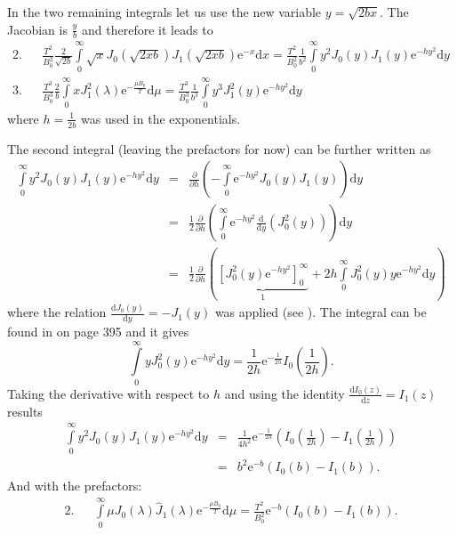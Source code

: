 \documentclass[a4paper,10pt]{article}
\begin{document}
In the two remaining integrals let us use the new variable $y=\sqrt{2 b x}$. The Jacobian is $\frac{y}{b}$ and therefore it leads to
\begin{eqnarray*}
	2. && \frac{T^2}{B_0^2} \frac{2}{\sqrt{2b}} \int \limits_{0}^{\infty} \sqrt{x} J_0(\sqrt{2 x b}) J_1(\sqrt{2 x b}) \mathrm{e}^{-x} \mathrm{d} x = \frac{T^2}{B_0^2} \frac{1}{b^2} \int \limits_{0}^{\infty} y^2 J_0(y) J_1(y) \mathrm{e}^{-h y^2} \mathrm{d}y \\
	3. && \frac{T^3}{B_0^3} \frac{2}{b} \int \limits_{0}^{\infty} x J_1^2(\lambda) \mathrm{e}^{-\frac{\mu B_0}{T}} \mathrm{d} \mu = \frac{T^3}{B_0^3} \frac{1}{b^3} \int \limits_{0}^{\infty} y^3 J_1^2(y) \mathrm{e}^{-h y^2} \mathrm{d} y
\end{eqnarray*}
where $h = \frac{1}{2b}$ was used in the exponentials. 

The second integral (leaving the prefactors for now) can be further written as
\begin{eqnarray*}
	\int \limits_{0}^{\infty} y^2 J_0(y) J_1(y) \mathrm{e}^{-h y^2} \mathrm{d}y &=& \frac{\partial}{\partial h} \left( - \int \limits_0^{\infty} \mathrm{e}^{-hy^2} J_0(y) J_1(y) \right) \mathrm{d} y\\
	&=& \frac{1}{2} \frac{\partial}{\partial h} \left( \int \limits_0^{\infty} \mathrm{e}^{-hy^2} \frac{\mathrm{d}}{\mathrm{d} y} \left(J_0^2(y)\right) \right) \mathrm{d}y \\
	&=& \frac{1}{2} \frac{\partial}{\partial h} \left( \underbrace{\left[ J_0^2(y) \mathrm{e}^{-h y^2} \right]_0^{\infty}}_{1}  + 2 h \int \limits_0^{\infty} J_0^2(y) y \mathrm{e}^{-h y^2} \mathrm{d}y \right)
\end{eqnarray*}
where the relation $\frac{\mathrm{d} J_0(y)}{\mathrm{d} y} = - J_1(y)$ was applied (see \cite{a_and_s}). The integral can be found in \cite{w_and_w} on page 395 and it gives
\begin{equation}
	\int \limits_{0}^{\infty} y J_0^2(y) \mathrm{e}^{-h y^2} \mathrm{d}y = \frac{1}{2h} \mathrm{e}^{-\frac{1}{2h}} I_0\left(\frac{1}{2h}\right).
\end{equation}
Taking the derivative with respect to $h$ and using the identity $\frac{\mathrm{d}I_0(z)}{\mathrm{d} z} = I_1(z)$ results
\begin{eqnarray}
	\int \limits_{0}^{\infty} y^2 J_0(y) J_1(y) \mathrm{e}^{-h y^2} \mathrm{d}y &=& \frac{1}{4h^2} \mathrm{e}^{-\frac{1}{2h}} \left( I_0\left( \frac{1}{2h} \right) - I_1\left( \frac{1}{2h} \right) \right) \nonumber \\
	&=& b^2 \mathrm{e}^{-b} \left( I_0(b) - I_1(b) \right).
	\label{eq:K2}
\end{eqnarray}
And with the prefactors:
\begin{eqnarray}
	2. && \int \limits_{0}^{\infty} \mu J_0(\lambda) \hat{J}_1(\lambda) \mathrm{e}^{-\frac{\mu B_0}{T}} \mathrm{d} \mu = \frac{T^2}{B_0^2} \mathrm{e}^{-b} \left( I_0(b) - I_1(b) \right).
\end{eqnarray}
\end{document}
